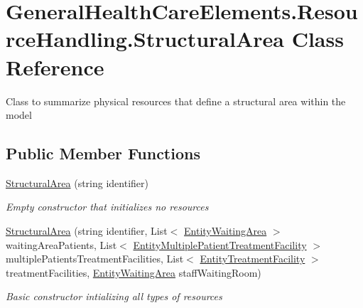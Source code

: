 \hypertarget{class_general_health_care_elements_1_1_resource_handling_1_1_structural_area}{}\section{General\+Health\+Care\+Elements.\+Resource\+Handling.\+Structural\+Area Class Reference}
\label{class_general_health_care_elements_1_1_resource_handling_1_1_structural_area}


Class to summarize physical resources that define a structural area within the model  


\subsection*{Public Member Functions}
\begin{DoxyCompactItemize}
\item 
\hyperlink{class_general_health_care_elements_1_1_resource_handling_1_1_structural_area_abcf5d1e3fa531c4970f37d2a0d09f15a}{Structural\+Area} (string identifier)
\begin{DoxyCompactList}\small\item\em Empty constructor that initializes no resources \end{DoxyCompactList}\item 
\hyperlink{class_general_health_care_elements_1_1_resource_handling_1_1_structural_area_ae1e2ce10ede778ffd06a4e97c0ae4509}{Structural\+Area} (string identifier, List$<$ \hyperlink{class_general_health_care_elements_1_1_entities_1_1_entity_waiting_area}{Entity\+Waiting\+Area} $>$ waiting\+Area\+Patients, List$<$ \hyperlink{class_general_health_care_elements_1_1_entities_1_1_entity_multiple_patient_treatment_facility}{Entity\+Multiple\+Patient\+Treatment\+Facility} $>$ multiple\+Patients\+Treatment\+Facilities, List$<$ \hyperlink{class_general_health_care_elements_1_1_entities_1_1_entity_treatment_facility}{Entity\+Treatment\+Facility} $>$ treatment\+Facilities, \hyperlink{class_general_health_care_elements_1_1_entities_1_1_entity_waiting_area}{Entity\+Waiting\+Area} staff\+Waiting\+Room)
\begin{DoxyCompactList}\small\item\em Basic constructor intializing all types of resources \end{DoxyCompactList}\end{DoxyCompactItemize}
